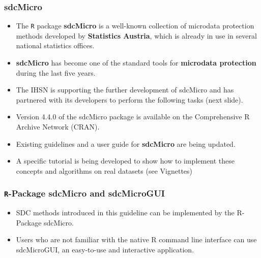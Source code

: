 \documentclass{beamer}
\begin{document}
	\begin{frame}
		\frametitle{sdcMicro}
		\begin{itemize}
			\item The \texttt{R} package \textbf{sdcMicro} is a well-known collection of microdata protection methods developed by \textbf{Statistics Austria}, which is already in use in several national statistics offices. 
			\item \textbf{sdcMicro} has become one of the standard tools for \textbf{microdata protection} during the last five years.
			\item The IHSN is supporting the further development of sdcMicro and has partnered with its developers to perform the following tasks (next slide).
		\end{itemize}
	\end{frame}
\begin{frame}
	\begin{itemize}
		\item Version 4.4.0 of the sdcMicro package is available on the Comprehensive R Archive Network (CRAN).
		\item Existing guidelines and a user guide for \textbf{sdcMicro} are being updated. 
		\item A specific tutorial is being developed to show how to implement these concepts and algorithms on real datasets (see 
		Vignettes)
	\end{itemize}
	
	
\end{frame}
\begin{frame}
\frametitle{\texttt{R}-Package sdcMicro and sdcMicroGUI}

\begin{itemize}
\item SDC methods introduced in this guideline can be implemented by the R-Package
	sdcMicro. 
\item Users who are not familiar with the native R command line interface
	can use sdcMicroGUI, an easy-to-use and interactive application. 
\end{itemize}
\end{frame}
\end{document}
